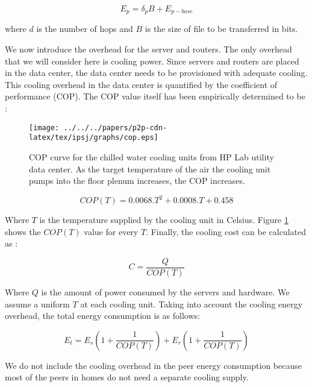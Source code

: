 \begin{equation}\label{eqn:E_p}
E_p = \delta_p B + E_{p-base}
\end{equation} 

where $d$ is the number of hops and $B$ is the size of file to be transferred in bits.

We now introduce the overhead for the server and routers. 
The only overhead that we will consider here is cooling power.  
Since servers and routers are placed in the data center, the data center needs to be provisioned with adequate cooling. 
This cooling overhead in the data center is quantified by the coefficient of performance (COP). 
The COP value itself has been empirically determined to be  \cite{moore2005making}:

\begin{figure}[thb]
\begin{center}
\texttt{[image: ../../../papers/p2p-cdn-latex/tex/ipsj/graphs/cop.eps]}
\end{center}
\caption{COP curve for the chilled water cooling units from HP Lab utility data center.
As the target temperature of the air the cooling unit pumps into the floor plenum increases, the COP increases.}
\label{fig:copgraph}
\end{figure} 

\begin{equation}\label{eqn:copt}
	COP(T) = 0.0068.T^2 + 0.0008.T + 0.458
\end{equation}

Where $T$ is the temperature supplied by the cooling unit in Celsius.
Figure \ref{fig:copgraph} shows the $COP(T)$ value for every $T$.
Finally, the cooling cost can be calculated as \cite{moore2005making}:

\begin{equation}\label{eqn:cost}
C = \frac{Q}{COP(T)}
\end{equation}

Where $Q$ is the amount of power consumed by the servers and hardware. 
We assume a uniform $T$ at each cooling unit. 
Taking into account the cooling energy overhead, the total energy consumption is as follows:

\begin{equation}
	E_{t} = E_s \left(1 + \frac{1}{COP(T)}\right) + E_r \left(1 + \frac{1}{COP(T)}\right)
\end{equation}

We do not include the cooling overhead in the peer energy consumption because most of the peers in homes do not need a separate cooling supply.


